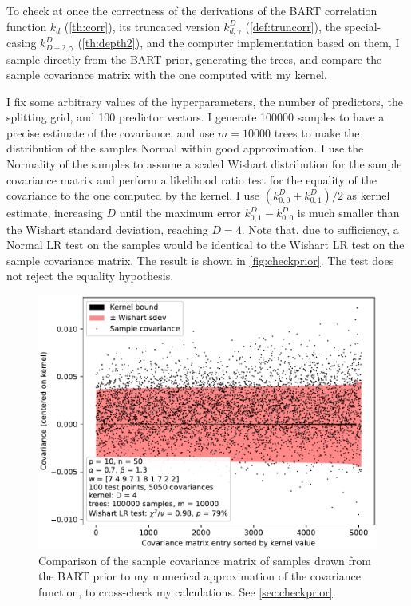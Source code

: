 \documentclass[a4paper]{article}
\theoremstyle{definition}
\let\oldmarginpar\marginpar
\renewcommand{\marginpar}[1]{\oldmarginpar{\sffamily\scriptsize #1}}
\renewcommand{\marginpar}[1]{\relax} %
\begin{document}
    To check at once the correctness of the derivations of the BART correlation function $k_d$ (\autoref{th:corr}), its truncated version $k^D_{d,\gamma}$ (\autoref{def:truncorr}), the special-casing $k^D_{D-2,\gamma}$ (\autoref{th:depth2}), and the computer implementation based on them, I sample directly from the BART prior, generating the trees, and compare the sample covariance matrix with the one computed with my kernel.
    
    I fix some arbitrary values of the hyperparameters, the number of predictors, the splitting grid, and 100 predictor vectors. I generate \num{100000} samples to have a precise estimate of the covariance, and use $m = \num{10000}$ trees to make the distribution of the samples Normal within good approximation. I use the Normality of the samples to assume a scaled Wishart distribution for the sample covariance matrix and perform a likelihood ratio test for the equality of the covariance to the one computed by the kernel. I use $(k^D_{0,0}+k^D_{0,1})/2$ as kernel estimate, increasing $D$ until the maximum error $k^D_{0,1}- k^D_{0,0}$ is much smaller than the Wishart standard deviation, reaching $D=4$. Note that, due to sufficiency, a Normal LR test on the samples would be identical to the Wishart LR test on the sample covariance matrix. The result is shown in \autoref{fig:checkprior}. The test does not reject the equality hypothesis.\marginpar{What version of the kernel did I use exactly here?}
        
    \begin{figure}

        \centering
        \includegraphics[width=80ex]{checkprior}
        
        \caption{\label{fig:checkprior} Comparison of the sample covariance
        matrix of samples drawn from the BART prior to my numerical
        approximation of the covariance function, to cross-check my
        calculations. See \autoref{sec:checkprior}.}
        
    \end{figure}
    
\end{document}
